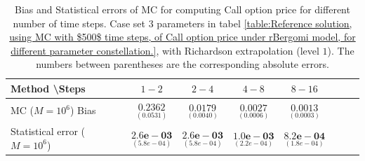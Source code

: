 \documentclass[11pt]{article}
\begin{document}
\begin{table}[h!]
	\centering
	\begin{tabular}{l*{6}{c}r}
		Method \textbackslash  Steps            & $1-2$ & $2-4$ & $4-8$ & $8-16$  \\
		\hline
		MC ($M=10^6$)  Bias   &$\underset{(    0.0531)}{\mathbf{0.2362}}$  & $\underset{( 0.0040)}{\mathbf{0.0179}}$  & $\underset{(  0.0006)}{\mathbf{0.0027}}$  & $\underset{(0.0003 )}{\mathbf{0.0013}}$ \\	
		
		Statistical error ($M=10^6$)    & $\underset{( 5.8e-04)}{\mathbf{2.6e-03}}$  &  $\underset{( 5.8e-04)}{\mathbf{2.6e-03}}$ & $\underset{( 2.2e-04)}{\mathbf{1.0e-03}}$ & $\underset{(1.8e-04 )}{\mathbf{ 8.2e-04}}$ \\
		
		\hline
	\end{tabular}
	\caption{Bias and Statistical errors of MC  for computing Call option price  for different number of time steps. Case set $3$ parameters in tabel \ref{table:Reference solution, using MC with $500$ time steps, of Call option price under rBergomi model, for different parameter constellation.}, with Richardson extrapolation (level $1$). The numbers between parentheses are the corresponding absolute errors.}
	\label{Bias and Statistical errors of MC ($M=10^6$)  for computing Call option price  for different number of time steps. Case set $3$ parameters, with Richardson extrapolation (level1). The numbers between parentheses are the corresponding absolute errors.}
\end{table}
\end{document}
